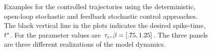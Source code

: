 \documentclass{article}
\begin{document}
\begin{figure}[h]
\begin{center}
\caption[]{Examples for the controlled trajectories using the deterministic,
open-loop stochastic and feedback stochastic control approaches. The
black vertical line in the plots indicates the desired spike-time, ${ t^* }$.
For the parameter values are ${ \tau_{c} }, {\beta} = [.75, 1.25]$. The three panels are
three different realizations of the model dynamics.}
\label{fig:control_trajectories_examples}
\end{center}
\end{figure}
\end{document}
